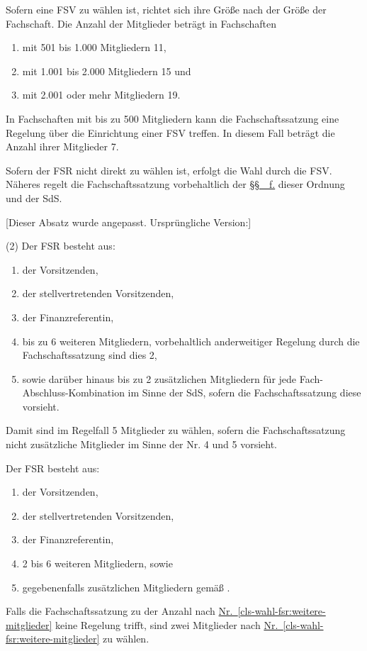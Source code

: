 \documentclass[%
draft,%
multilinesections%
]{fswo}
\newcommand\bemFe[1] {{\color{Cyan}[#1]}}
\newcommand\remark[1]{\begin{addmargin}{1cm}#1\end{addmargin}}
\newcommand\bemFe[1]{}%
\newcommand\remark[1]{}
\newcommand*{\refClauseF}[1]{\hyperref[#1]{\S\S~\refClauseN{#1}~f.}}
\newcommand*{\refItem}[1]{\hyperref[#1]{Nr.~\ref{#1}}}
\begin{document}
\begin{contract}
\label{cls-wahl-fsv}
Sofern eine FSV zu wählen ist, richtet sich ihre Größe nach der Größe der Fachschaft.
Die Anzahl der Mitglieder beträgt in Fachschaften
\begin{enumerate}
  \item mit 501 bis 1.000 Mitgliedern 11,
  \item mit 1.001 bis 2.000 Mitgliedern 15 und
  \item mit 2.001 oder mehr Mitgliedern 19.
\end{enumerate}

In Fachschaften mit bis zu 500 Mitgliedern kann die Fachschaftssatzung eine Regelung über die Einrichtung einer FSV treffen.
In diesem Fall beträgt die Anzahl ihrer Mitglieder 7.

\label{cls-wahl-fsr}
Sofern der FSR nicht direkt zu wählen ist, erfolgt die Wahl durch die FSV.
Näheres regelt die Fachschaftssatzung vorbehaltlich der \refClauseF{cls-auszaehlung-stimmen} dieser Ordnung und der SdS.

\remark{%
\bemFe{Dieser Absatz wurde angepasst. Ursprüngliche Version:} \color{Gray}

(2) Der FSR besteht aus:
\begin{enumerate}
  \item der Vorsitzenden,
  \item der stellvertretenden Vorsitzenden,
  \item der Finanzreferentin,
  \item bis zu 6 weiteren Mitgliedern, vorbehaltlich anderweitiger Regelung durch die Fachschaftssatzung sind dies 2,
  \item sowie darüber hinaus bis zu 2 zusätzlichen Mitgliedern für jede Fach-Abschluss-Kombination im Sinne der SdS, sofern die Fachschaftssatzung diese vorsieht.
\end{enumerate}
Damit sind im Regelfall 5 Mitglieder zu wählen, sofern die Fachschaftssatzung nicht zusätzliche Mitglieder im Sinne der Nr. 4 und 5 vorsieht.%
}

\begingroup\makeatletter\ifFK@draft\color{Green}\fi\makeatother
Der FSR besteht aus:
\begin{enumerate}
  \item der Vorsitzenden,
  \item der stellvertretenden Vorsitzenden,
  \item der Finanzreferentin,
  \item 2 bis 6 weiteren Mitgliedern, sowie\label{cls-wahl-fsr:weitere-mitglieder}
  \item gegebenenfalls zusätzlichen Mitgliedern gemäß .
\end{enumerate}
Falls die Fachschaftssatzung zu der Anzahl nach \refItem{cls-wahl-fsr:weitere-mitglieder} keine Regelung trifft, sind zwei Mitglieder nach \refItem{cls-wahl-fsr:weitere-mitglieder} zu wählen.
\endgroup


\end{contract}
\end{document}
